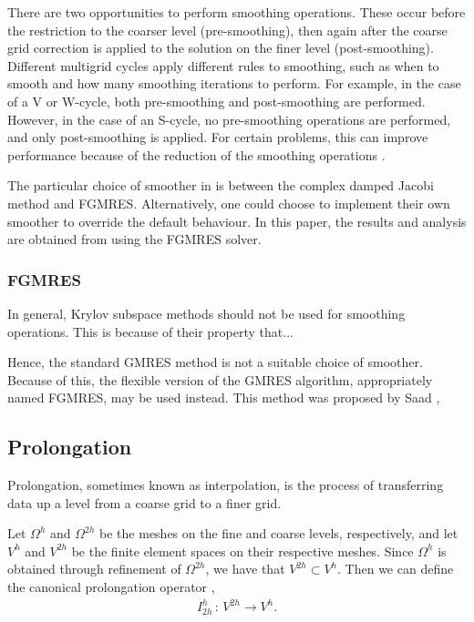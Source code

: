 There are two opportunities to perform smoothing operations.
These occur before the restriction to the coarser level (pre-smoothing), then again after the coarse grid correction is applied to the solution on the finer level (post-smoothing).
Different multigrid cycles apply different rules to smoothing, such as when to smooth and how many smoothing iterations to perform.
For example, in the case of a V or W-cycle, both pre-smoothing and post-smoothing are performed.
However, in the case of an S-cycle, no pre-smoothing operations are performed, and only post-smoothing is applied.
For certain problems, this can improve performance because of the reduction of the smoothing operations \cite{iyengar}.

The particular choice of smoother in \oomph is between the complex damped Jacobi method and FGMRES.
Alternatively, one could choose to implement their own smoother to override the default behaviour.
In this paper, the results and analysis are obtained from using the FGMRES solver.


\subsubsection{FGMRES}

In general, Krylov subspace methods should not be used for smoothing operations.
This is because of their property that...

Hence, the standard GMRES method is not a suitable choice of smoother.
Because of this, the flexible version of the GMRES algorithm, appropriately named FGMRES, may be used instead.
This method was proposed by Saad \cite{fgmres}, 





\subsection{Prolongation}

Prolongation, sometimes known as interpolation, is the process of transferring data up a level from a coarse grid to a finer grid.

Let $\Omega^h$ and $\Omega^{2h}$ be the meshes on the fine and coarse levels, respectively, and let $V^{h}$ and $V^{2h}$ be the finite element spaces on their respective meshes.
Since $\Omega^{h}$ is obtained through refinement of $\Omega^{2h}$, we have that $V^{2h}\subset V^h$.
Then we can define the canonical prolongation operator \cite{volker},
\begin{align}
	I^h_{2h} \, : \, V^{2h} \rightarrow V^h.
\end{align}


